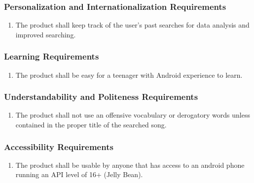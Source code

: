 \documentclass[]{article}
\newcounter{saveenum}
\newcommand{\pauseEnum}{\setcounter{saveenum}{\value{enumi}}}
\newcommand{\resumeEnum}{\setcounter{enumi}{\value{saveenum}}}
\begin{document}
\subsubsection{Personalization and Internationalization Requirements}
\label{ssub:personalization_and_internationalization_requirements}
\begin{enumerate}[{UH}1. ]
	\resumeEnum
	\item The product shall keep  track of the user's past searches for data analysis and improved searching.
	\pauseEnum
\end{enumerate}

\subsubsection{Learning Requirements}
\label{ssub:learning_requirements}
\begin{enumerate}[{UH}1. ]
	\resumeEnum
	\item The product shall be easy for a teenager with Android experience to learn.
	\pauseEnum
\end{enumerate}

\subsubsection{Understandability and Politeness Requirements}
\label{ssub:understandability_and_politeness_requirements}
\begin{enumerate}[{UH}1. ]
	\resumeEnum
	\item The product shall not use an offensive vocabulary or derogatory words unless contained in the proper title of the searched song.
	\pauseEnum
\end{enumerate}

\subsubsection{Accessibility Requirements}
\label{ssub:accessibility_requirements}
\begin{enumerate}[{UH}1. ]
	\resumeEnum
	\item The product shall be usable by anyone that has access to an android phone running an API level of 16+ (Jelly Bean).
	\pauseEnum
\end{enumerate}

\end{document}
